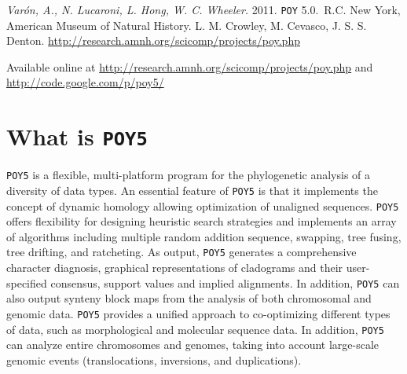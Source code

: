 \documentclass[11pt]{book}
\newcommand{\commandstyle}[1]{\texttt{#1}}
\newcommand{\poy}{\commandstyle{POY5}\xspace}
\begin{document}
\begin{flushleft}
\vspace*{0.25cm}
\emph{Var\'on, A., N. Lucaroni, L. Hong, W. C. Wheeler.} 2011. \texttt{POY} 5.0.\buildnumber\ R.C. New York, 
American Museum of Natural History. L. M. Crowley, M. Cevasco, J. S. S. Denton. 
\url{http://research.amnh.org/scicomp/projects/poy.php}

\vspace*{0.25cm}

Available online at
\url{http://research.amnh.org/scicomp/projects/poy.php}
and
\url{http://code.google.com/p/poy5/} 


\end{flushleft}

\tableofcontents


\chapter{What is \poy}

\poy is a flexible, multi-platform program for the phylogenetic analysis of a diversity of data types. %
An essential feature of \poy is that it implements the concept of dynamic homology \cite{wheeler2001a, wheeler2001} allowing optimization of unaligned sequences. \poy offers flexibility for designing heuristic search strategies and implements an array of algorithms including multiple random addition sequence, swapping, tree fusing, tree drifting, and ratcheting. As output, \poy generates a comprehensive character diagnosis, graphical representations of cladograms and their user-specified consensus, support values and implied alignments.  In addition, \poy can also output synteny block maps from the analysis of both chromosomal and genomic data. \poy provides a unified approach to co-optimizing different types of data, such as morphological and molecular sequence data. In addition, \poy can analyze entire chromosomes and genomes, taking into account large-scale genomic events (translocations, inversions, and duplications).
\end{document}
